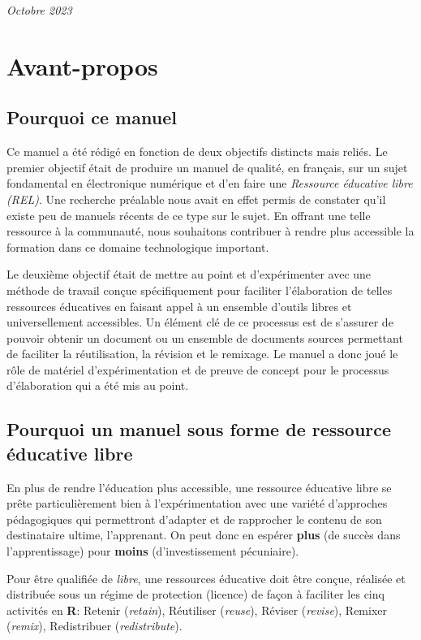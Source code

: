 \documentclass[letter, oneside]{book}
\begin{document}
\noindent \textit{Octobre 2023} %

\chapter*{Avant-propos}
\label{sec:org40d5da4}
\section*{Pourquoi ce manuel}
\label{sec:org93fed01}

Ce manuel a été rédigé en fonction de deux objectifs distincts mais
reliés. Le premier objectif était de produire un manuel de qualité, en
français, sur un sujet fondamental en électronique numérique et d'en
faire une \emph{Ressource éducative libre (REL)}. Une recherche préalable
nous avait en effet permis de constater qu'il existe peu de manuels
récents de ce type sur le sujet.  En offrant une telle ressource à la
communauté, nous souhaitons contribuer à rendre plus accessible la
formation dans ce domaine technologique important.

Le deuxième objectif était de mettre au point et d'expérimenter avec
une méthode de travail conçue spécifiquement pour faciliter
l'élaboration de telles ressources éducatives en faisant appel à un
ensemble d'outils libres et universellement accessibles.  Un élément
clé de ce processus est de s'assurer de pouvoir obtenir un
document ou un ensemble de documents sources permettant de
faciliter la réutilisation, la révision et le remixage. Le manuel a
donc joué le rôle de matériel d'expérimentation et de preuve de
concept pour le processus d'élaboration qui a été mis au point.

\section*{Pourquoi un manuel sous forme de ressource éducative libre}
\label{sec:org57a4fdf}

En plus de rendre l'éducation plus accessible, une ressource éducative
libre se prête particulièrement bien à l'expérimentation avec une
variété d'approches pédagogiques qui permettront d'adapter et de 
rapprocher le contenu de son destinataire ultime, l'apprenant. On
peut donc en espérer \textbf{plus} (de succès dans l'apprentissage) pour
\textbf{moins} (d'investissement pécuniaire).

Pour être qualifiée de \emph{libre}, une ressources éducative doit être
conçue, réalisée et distribuée sous un régime de protection (licence)
de façon à faciliter les cinq activités en \textbf{R}: Retenir (\emph{retain}),
Réutiliser (\emph{reuse}), Réviser (\emph{revise}), Remixer (\emph{remix}),
Redistribuer (\emph{redistribute}).
\end{document}
